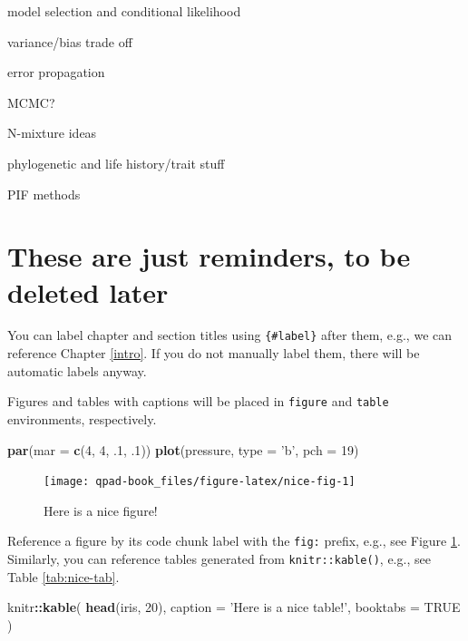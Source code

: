 \documentclass[12pt,]{book}
\newenvironment{Shaded}{\begin{snugshade}}{\end{snugshade}}
\newcommand{\DataTypeTok}[1]{\textcolor[rgb]{0.13,0.29,0.53}{#1}}
\newcommand{\DecValTok}[1]{\textcolor[rgb]{0.00,0.00,0.81}{#1}}
\newcommand{\FloatTok}[1]{\textcolor[rgb]{0.00,0.00,0.81}{#1}}
\newcommand{\KeywordTok}[1]{\textcolor[rgb]{0.13,0.29,0.53}{\textbf{#1}}}
\newcommand{\NormalTok}[1]{#1}
\newcommand{\OperatorTok}[1]{\textcolor[rgb]{0.81,0.36,0.00}{\textbf{#1}}}
\newcommand{\OtherTok}[1]{\textcolor[rgb]{0.56,0.35,0.01}{#1}}
\newcommand{\StringTok}[1]{\textcolor[rgb]{0.31,0.60,0.02}{#1}}
\begin{document}
model selection and conditional likelihood

variance/bias trade off

error propagation

MCMC?

N-mixture ideas

phylogenetic and life history/trait stuff

PIF methods

\hypertarget{these-are-just-reminders-to-be-deleted-later}{%
\section*{These are just reminders, to be deleted later}\label{these-are-just-reminders-to-be-deleted-later}}

You can label chapter and section titles using \texttt{\{\#label\}} after them, e.g., we can reference Chapter \ref{intro}. If you do not manually label them, there will be automatic labels anyway.

Figures and tables with captions will be placed in \texttt{figure} and \texttt{table} environments, respectively.

\begin{Shaded}
\begin{Highlighting}[]
\KeywordTok{par}\NormalTok{(}\DataTypeTok{mar =} \KeywordTok{c}\NormalTok{(}\DecValTok{4}\NormalTok{, }\DecValTok{4}\NormalTok{, }\FloatTok{.1}\NormalTok{, }\FloatTok{.1}\NormalTok{))}
\KeywordTok{plot}\NormalTok{(pressure, }\DataTypeTok{type =} \StringTok{'b'}\NormalTok{, }\DataTypeTok{pch =} \DecValTok{19}\NormalTok{)}
\end{Highlighting}
\end{Shaded}

\begin{figure}

{\centering \texttt{[image: qpad-book\_files/figure-latex/nice-fig-1]} 

}

\caption{Here is a nice figure!}\label{fig:nice-fig}
\end{figure}

Reference a figure by its code chunk label with the \texttt{fig:} prefix, e.g., see Figure \ref{fig:nice-fig}. Similarly, you can reference tables generated from \texttt{knitr::kable()}, e.g., see Table \ref{tab:nice-tab}.

\begin{Shaded}
\begin{Highlighting}[]
\NormalTok{knitr}\OperatorTok{::}\KeywordTok{kable}\NormalTok{(}
  \KeywordTok{head}\NormalTok{(iris, }\DecValTok{20}\NormalTok{), }\DataTypeTok{caption =} \StringTok{'Here is a nice table!'}\NormalTok{,}
  \DataTypeTok{booktabs =} \OtherTok{TRUE}
\NormalTok{)}
\end{Highlighting}
\end{Shaded}
\end{document}
